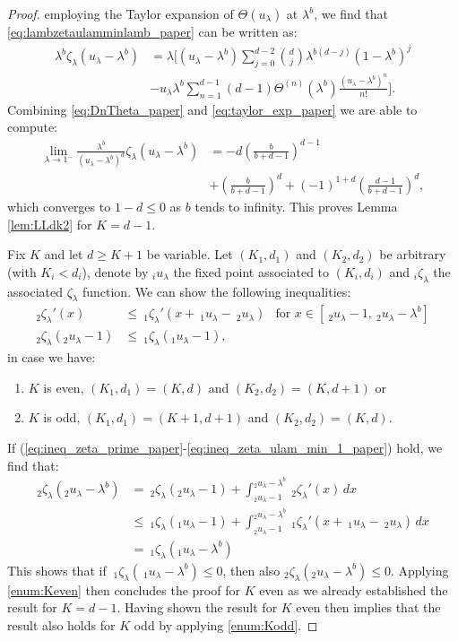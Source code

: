 \documentclass[12pt]{report}
\begin{document}
\begin{proof}
employing the Taylor expansion of $\Theta(u_\lambda)$ at $\lambda^b$, we find that \eqref{eq:lambzetaulamminlamb_paper} can be written as:
\begin{align}
\lambda^b \zeta_\lambda(u_\lambda-\lambda^b)
&=
\lambda \bigg[ (u_\lambda - \lambda^b) \sum_{j=0}^{d-2} \binom{d}{j} \lambda^{b(d-j)} (1-\lambda^b)^j\\
&- u_\lambda \lambda^b \sum_{n=1}^{d-1} (d-1) \Theta^{(n)}(\lambda^b) \frac{(u_\lambda-\lambda^b)^n}{n!}\bigg].\label{eq:taylor_exp_paper}
\end{align}
Combining \eqref{eq:DnTheta_paper} and \eqref{eq:taylor_exp_paper} we are able to compute:
\begin{align*}
\lim_{\lambda \rightarrow 1^-} \frac{\lambda^b}{(u_\lambda-\lambda^b)^d} \zeta_\lambda(u_\lambda-\lambda^b)
&=-d \left( \frac{b}{b+d-1} \right)^{d-1}\\
& + \left(\frac{b}{b+d-1}\right)^d + (-1)^{1+d} \left( \frac{d-1}{b+d-1} \right)^d,
\end{align*}
which converges to $1-d \leq 0$ as $b$ tends to infinity. This proves Lemma \ref{lem:LLdk2}
for $K=d-1$.

Fix $K$ and let $d \geq K+1$ be variable. Let $(K_1,d_1)$ and $(K_2,d_2)$ be arbitrary (with $K_i < d_i$), denote by $_i u _\lambda$ the fixed point associated to $(K_i,d_i)$ and $_i\zeta_\lambda$ the associated $\zeta_\lambda$ function. We can show the following inequalities:
\begin{align}
_2 \zeta _\lambda'(x) & \leq\  _1\zeta _\lambda'(x+\ _1u_\lambda -\ _2u_\lambda) & \mbox{for }  x \in [\ _2u_\lambda - 1,\ _2u_\lambda-\lambda^b] \label{eq:ineq_zeta_prime_paper}\\
_2\zeta_\lambda(_2 u _\lambda - 1) &\leq\ _1\zeta _\lambda(_1 u _\lambda - 1), & \label{eq:ineq_zeta_ulam_min_1_paper}
\end{align}
in case we have:
\begin{enumerate}[label=(\roman*),topsep=0pt]
\item \label{enum:Keven} $K$ is even, $(K_1,d_1)=(K,d)$ and $(K_2,d_2)=(K,d+1)$ or
\item \label{enum:Kodd} $K$ is odd, $(K_1,d_1)=(K+1,d+1)$ and $(K_2,d_2)=(K,d)$.
\end{enumerate}
If (\ref{eq:ineq_zeta_prime_paper}-\ref{eq:ineq_zeta_ulam_min_1_paper}) hold, we find that:
\begin{align*}
_2\zeta_\lambda(_2u_\lambda-\lambda^b)
&=\ _2\zeta_\lambda( _2u_\lambda-1)+\int_{_2 u_\lambda-1}^{_2 u_\lambda-\lambda^b} \ _2 \zeta_\lambda'(x)\, dx\\
&\leq\ _1 \zeta_\lambda(_1u_\lambda-1)+\int_{_2u_\lambda-1}^{_2u_\lambda-\lambda^b} \ _1 \zeta_\lambda'(x+\ _1u_{\lambda} -\ _2u_{\lambda})\, dx\\
&=\ _1 \zeta_\lambda(_1 u_{\lambda} - \lambda^b)
\end{align*}
This shows that if $\ _1 \zeta_\lambda(\ _1 u_{\lambda} - \lambda^b) \leq 0$, then also $_2 \zeta_\lambda(_2u_\lambda-\lambda^b) \leq 0$. Applying \ref{enum:Keven} then concludes the proof for $K$ even as we already established the result for $K=d-1$. Having shown the result for $K$
even then implies that the result also holds for $K$ odd by applying \ref{enum:Kodd}.


\end{proof}
\end{document}
